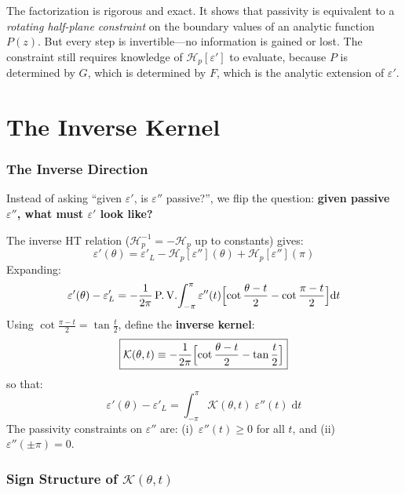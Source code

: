 \documentclass[11pt]{article}
\newcommand{\eps}{\varepsilon}
\newcommand{\Hp}{\mathcal{H}_p}
\newcommand{\PV}{\text{P.\,V.}}
\newcommand{\dd}{\mathrm{d}}
\newcommand{\K}{\mathcal{K}}
\begin{document}
The factorization is rigorous and exact.  It shows that passivity is equivalent to a \emph{rotating half-plane constraint} on the boundary values of an analytic function $P(z)$.  But every step is invertible---no information is gained or lost.  The constraint still requires knowledge of $\Hp[\eps']$ to evaluate, because $P$ is determined by $G$, which is determined by $F$, which is the analytic extension of $\eps'$.


\part{The Inverse Kernel}

\section{The Inverse Direction}\label{sec:inverse}

Instead of asking ``given $\eps'$, is $\eps''$ passive?'', we flip the question: \textbf{given passive $\eps''$, what must $\eps'$ look like?}

The inverse HT relation ($\Hp^{-1} = -\Hp$ up to constants) gives:
\begin{equation}
\eps'(\theta) = \eps'_L - \Hp[\eps''](\theta) + \Hp[\eps''](\pi)
\end{equation}
Expanding:
\begin{equation}\label{eq:inverse-integral}
\eps'(\theta) - \eps'_L = -\frac{1}{2\pi}\,\PV\!\int_{-\pi}^{\pi}\eps''(t)\Bigl[\cot\frac{\theta - t}{2} - \cot\frac{\pi - t}{2}\Bigr]\dd t
\end{equation}
Using $\cot\frac{\pi - t}{2} = \tan\frac{t}{2}$, define the \textbf{inverse kernel}:
\begin{equation}\label{eq:kernel-def}
\boxed{\K(\theta, t) \equiv -\frac{1}{2\pi}\Bigl[\cot\frac{\theta - t}{2} - \tan\frac{t}{2}\Bigr]}
\end{equation}
so that:
\begin{equation}\label{eq:eps-from-kernel}
\eps'(\theta) - \eps'_L = \int_{-\pi}^{\pi}\K(\theta, t)\;\eps''(t)\;\dd t
\end{equation}
The passivity constraints on $\eps''$ are: (i)~$\eps''(t) \geq 0$ for all $t$, and (ii)~$\eps''(\pm\pi) = 0$.

\section{Sign Structure of $\K(\theta, t)$}
\end{document}
